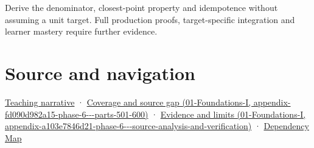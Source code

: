 Derive the denominator, closest-point property and idempotence without assuming a unit target. Full production proofs, target-specific integration and learner mastery require further evidence.

\section{Source and navigation}\label{appendix-505a502c372a-source-and-navigation}

\href{Continuous\%20Notes/Computing\%20Foundations\%20-\%20From\%20Bits\%20to\%20C++\%20and\%20Systems\%20APIs\#Projection\%20separates\%20useful\%20movement\%20from\%20sideways\%20movement}{Teaching narrative} · \href{../01-Foundations-I/main.pdf\#nameddest=appendix-fd090d982a15-phase-6---parts-501-600}{Coverage and source gap (01-Foundations-I, appendix-fd090d982a15-phase-6-\/-\/-parts-501-600)} · \href{../01-Foundations-I/main.pdf\#nameddest=appendix-a103e7846d21-phase-6---source-analysis-and-verification}{Evidence and limits (01-Foundations-I, appendix-a103e7846d21-phase-6-\/-\/-source-analysis-and-verification)} · \hyperref[appendix-4ad47bdd269a]{Dependency Map}
